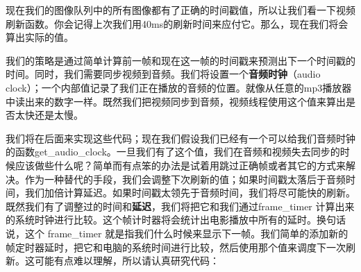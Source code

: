 现在我们的图像队列中的所有图像都有了正确的时间戳值，所以让我们看一下视频刷新函数。你会记得上次我们用40ms的刷新时间来应付它。那么，现在我们将会算出实际的值。

我们的策略是通过简单计算前一帧和现在这一帧的时间戳来预测出下一个时间戳的时间。同时，我们需要同步视频到音频。我们将设置一个\textbf{音频时钟}（audio clock）；一个内部值记录了我们正在播放的音频的位置。就像从任意的mp3播放器中读出来的数字一样。既然我们把视频同步到音频，视频线程使用这个值来算出是否太快还是太慢。

我们将在后面来实现这些代码；现在我们假设我们已经有一个可以给我们音频时钟的函数get_audio_clock。一旦我们有了这个值，我们在音频和视频失去同步的时候应该做些什么呢？简单而有点笨的办法是试着用跳过正确帧或者其它的方式来解决。作为一种替代的手段，我们会调整下次刷新的值；如果时间戳太落后于音频时间，我们加倍计算延迟。如果时间戳太领先于音频时间，我们将尽可能快的刷新。既然我们有了调整过的时间和\textbf{延迟}，我们将把它和我们通过frame_timer 计算出来的系统时钟进行比较。这个帧计时器将会统计出电影播放中所有的延时。换句话说，这个 frame_timer 就是指我们什么时候来显示下一帧。我们简单的添加新的帧定时器延时，把它和电脑的系统时间进行比较，然后使用那个值来调度下一次刷新。这可能有点难以理解，所以请认真研究代码：

